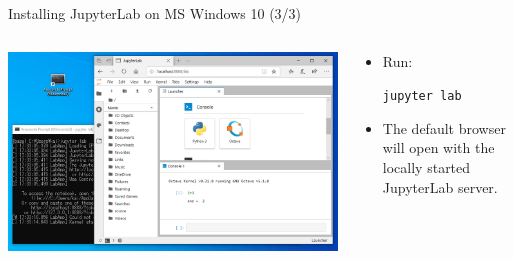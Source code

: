 \begin{frame}{Installing JupyterLab on MS Windows 10 (3/3)}
\begin{columns}
\begin{column}{0.7\textwidth}
\includegraphics[width=\textwidth]{res/ms_windows/win_miniconda_jupyterlab.png}
\end{column}
\begin{column}{0.3\textwidth}
\begin{itemize}
\itemsep4em
\item
Run:

\texttt{jupyter lab}

\item
The default browser will open with the locally started JupyterLab server.
\end{itemize}
\end{column}
\end{columns}
\end{frame}